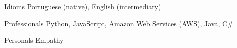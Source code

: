 
\begin{cvskills}
  \cvskill
  {Idioms} %
  {Portuguese (native), English (intermediary)} %

  \cvskill
  {Professionals} %
  {Python, JavaScript, Amazon Web Services (AWS), Java, C\#} %

  \cvskill
  {Personals}
  {Empathy}
\end{cvskills}
